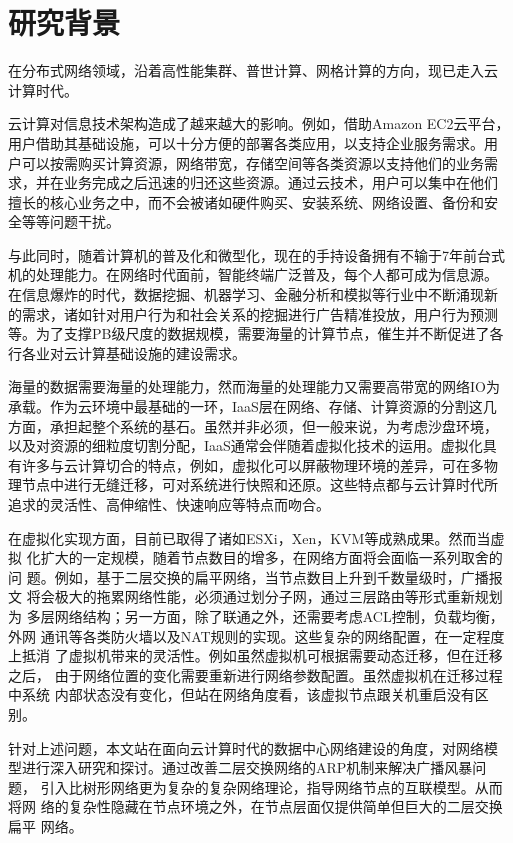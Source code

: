 \documentclass[phd,nobackinfo]{scutthesis}
\begin{document}
\section{研究背景}

在分布式网络领域，沿着高性能集群、普世计算、网格计算的方向，现已走入云
计算时代。

云计算对信息技术架构造成了越来越大的影响。例如，借助Amazon EC2云平台，
用户借助其基础设施，可以十分方便的部署各类应用，以支持企业服务需求。用
户可以按需购买计算资源，网络带宽，存储空间等各类资源以支持他们的业务需
求，并在业务完成之后迅速的归还这些资源。通过云技术，用户可以集中在他们
擅长的核心业务之中，而不会被诸如硬件购买、安装系统、网络设置、备份和安
全等等问题干扰。

与此同时，随着计算机的普及化和微型化，现在的手持设备拥有不输于7年前台式
机的处理能力。在网络时代面前，智能终端广泛普及，每个人都可成为信息源。
在信息爆炸的时代，数据挖掘、机器学习、金融分析和模拟等行业中不断涌现新
的需求，诸如针对用户行为和社会关系的挖掘进行广告精准投放，用户行为预测
等。为了支撑PB级尺度的数据规模，需要海量的计算节点，催生并不断促进了各
行各业对云计算基础设施的建设需求。

海量的数据需要海量的处理能力，然而海量的处理能力又需要高带宽的网络IO为
承载。作为云环境中最基础的一环，IaaS层在网络、存储、计算资源的分割这几
方面，承担起整个系统的基石。虽然并非必须，但一般来说，为考虑沙盘环境，
以及对资源的细粒度切割分配，IaaS通常会伴随着虚拟化技术的运用。虚拟化具
有许多与云计算切合的特点，例如，虚拟化可以屏蔽物理环境的差异，可在多物
理节点中进行无缝迁移，可对系统进行快照和还原。这些特点都与云计算时代所
追求的灵活性、高伸缩性、快速响应等特点而吻合。

在虚拟化实现方面，目前已取得了诸如ESXi，Xen，KVM等成熟成果。然而当虚拟
化扩大的一定规模，随着节点数目的增多，在网络方面将会面临一系列取舍的问
题。例如，基于二层交换的扁平网络，当节点数目上升到千数量级时，广播报文
将会极大的拖累网络性能，必须通过划分子网，通过三层路由等形式重新规划为
多层网络结构；另一方面，除了联通之外，还需要考虑ACL控制，负载均衡，外网
通讯等各类防火墙以及NAT规则的实现。这些复杂的网络配置，在一定程度上抵消
了虚拟机带来的灵活性。例如虽然虚拟机可根据需要动态迁移，但在迁移之后，
由于网络位置的变化需要重新进行网络参数配置。虽然虚拟机在迁移过程中系统
内部状态没有变化，但站在网络角度看，该虚拟节点跟关机重启没有区别。

针对上述问题，本文站在面向云计算时代的数据中心网络建设的角度，对网络模
型进行深入研究和探讨。通过改善二层交换网络的ARP机制来解决广播风暴问题，
引入比树形网络更为复杂的复杂网络理论，指导网络节点的互联模型。从而将网
络的复杂性隐藏在节点环境之外，在节点层面仅提供简单但巨大的二层交换扁平
网络。
\end{document}
